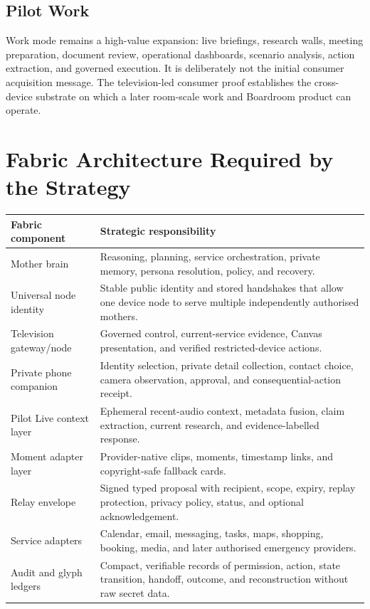 \documentclass[11pt,a4paper]{article}
\begin{document}
\subsection{Pilot Work}

Work mode remains a high-value expansion: live briefings, research walls,
meeting preparation, document review, operational dashboards, scenario
analysis, action extraction, and governed execution.  It is deliberately not
the initial consumer acquisition message.  The television-led consumer proof
establishes the cross-device substrate on which a later room-scale work and
Boardroom product can operate.

\section{Fabric Architecture Required by the Strategy}

\begin{table}[ht]
\centering
\small
\begin{tabularx}{\textwidth}{@{}p{38mm}X@{}}
\toprule
Fabric component & Strategic responsibility\\
\midrule
Mother brain & Reasoning, planning, service orchestration, private memory,
persona resolution, policy, and recovery.\\
Universal node identity & Stable public identity and stored handshakes that
allow one device node to serve multiple independently authorised mothers.\\
Television gateway/node & Governed control, current-service evidence, Canvas
presentation, and verified restricted-device actions.\\
Private phone companion & Identity selection, private detail collection,
contact choice, camera observation, approval, and consequential-action receipt.\\
Pilot Live context layer & Ephemeral recent-audio context, metadata fusion,
claim extraction, current research, and evidence-labelled response.\\
Moment adapter layer & Provider-native clips, moments, timestamp links, and
copyright-safe fallback cards.\\
Relay envelope & Signed typed proposal with recipient, scope, expiry, replay
protection, privacy policy, status, and optional acknowledgement.\\
Service adapters & Calendar, email, messaging, tasks, maps, shopping, booking,
media, and later authorised emergency providers.\\
Audit and glyph ledgers & Compact, verifiable records of permission, action,
state transition, handoff, outcome, and reconstruction without raw secret data.\\
\bottomrule
\end{tabularx}
\end{table}
\end{document}

